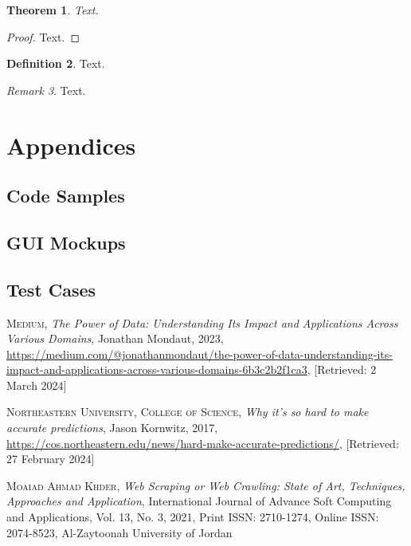 \documentclass{thesis-ekf}
\newtheorem{theorem}{Theorem}[chapter]
\theoremstyle{definition}
\newtheorem{definition}[theorem]{Definition}
\theoremstyle{remark}
\newtheorem{remark}[theorem]{Remark}
\begin{document}
{\begin{theorem}
Text.
\end{theorem}

\begin{proof}
Text.
\end{proof}

\begin{definition}
Text.
\end{definition}

\begin{remark}
Text.
\end{remark}


\chapter{Appendices}

\section{Code Samples}
\section{GUI Mockups}
\section{Test Cases}


\begin{thebibliography}{2}

\textsc{Medium}, 
\emph {The Power of Data: Understanding Its Impact and Applications Across Various Domains}, Jonathan Mondaut, 2023, \url{https://medium.com/@jonathanmondaut/the-power-of-data-understanding-its-impact-and-applications-across-various-domains-6b3c2b2f1ca3}, [Retrieved: 2 March 2024]

\textsc{Northeastern University, College of Science},
\emph{Why it’s so hard to make accurate predictions}, Jason Kornwitz, 2017, \url{https://cos.northeastern.edu/news/hard-make-accurate-predictions/}, [Retrieved: 27 February 2024]

\textsc{Moaiad Ahmad Khder},
\emph{Web Scraping or Web Crawling: State of Art, Techniques, Approaches and Application}, 
International Journal of Advance Soft Computing and Applications, 
Vol. 13, No. 3, 2021, 
Print ISSN: 2710-1274, Online ISSN: 2074-8523, 
Al-Zaytoonah University of Jordan


\end{thebibliography}}
\end{document}

